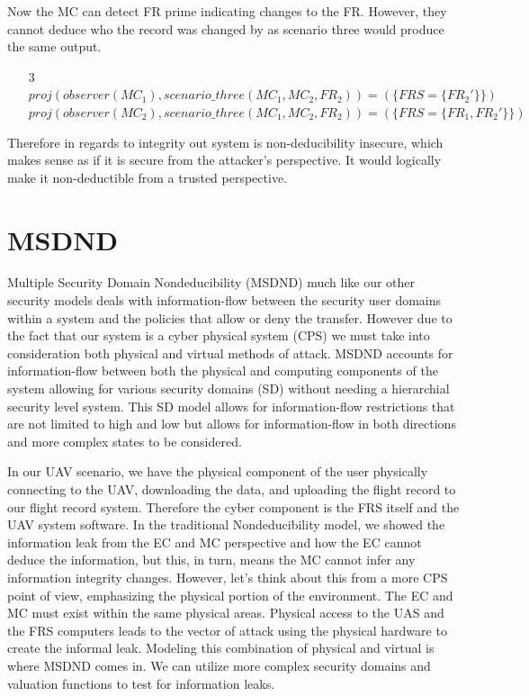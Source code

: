\documentclass[10pt,journal,compsoc]{IEEEtran}
\begin{document}
Now the MC can detect FR prime indicating changes to the FR. However, they cannot deduce who the record was changed by as scenario three would produce the same output.

\begin{enumerate}
  \item[3] $proj(observer (MC_1),scenario\_three(MC_1, MC_2, FR_2)) = (\{FRS = \{FR_2'\}\})$ \\
  $proj(observer (MC_2),scenario\_three(MC_1, MC_2, FR_2)) = (\{FRS = \{FR_1, FR_2'\}\})$ \\
\end{enumerate}

Therefore in regards to integrity out system is non-deducibility insecure, which makes sense as if it is secure from the attacker's perspective. It would logically make it non-deductible from a trusted perspective.

\section{MSDND}

Multiple Security Domain Nondeducibility (MSDND) much like our other security models deals with information-flow between the security user domains within a system and the policies that allow or deny the transfer. However due to the fact that our system is a cyber physical system (CPS) we must take into consideration both physical and virtual methods of attack. MSDND accounts for information-flow between both the physical and computing components of the system allowing for various security domains (SD) without needing a hierarchial security level system. This SD model allows for information-flow restrictions that are not limited to high and low but allows for information-flow in both directions and more complex states to be considered. 

In our UAV scenario, we have the physical component of the user physically connecting to the UAV, downloading the data, and uploading the flight record to our flight record system. Therefore the cyber component is the FRS itself and the UAV system software. In the traditional Nondeducibility model, we showed the information leak from the EC and MC perspective and how the EC cannot deduce the information, but this, in turn, means the MC cannot infer any information integrity changes. However, let's think about this from a more CPS point of view, emphasizing the physical portion of the environment. The EC and MC must exist within the same physical areas. Physical access to the UAS and the FRS computers leads to the vector of attack using the physical hardware to create the informal leak. Modeling this combination of physical and virtual is where MSDND comes in. We can utilize more complex security domains and valuation functions to test for information leaks. 
\end{document}
